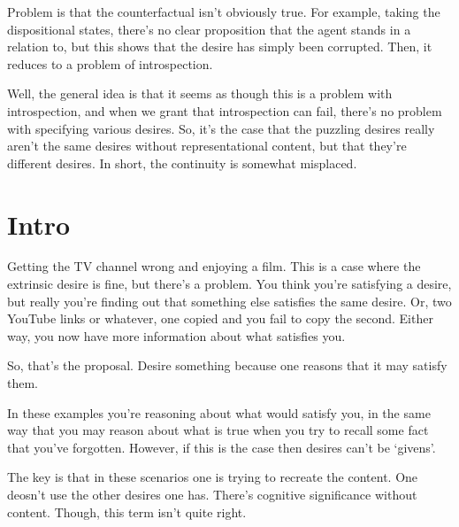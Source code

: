 \documentclass[10pt]{article}
\begin{document}


{\color{red} Problem is that the counterfactual isn't obviously true.
  For example, taking the dispositional states, there's no clear proposition that the agent stands in a relation to, but this shows that the desire has simply been corrupted.
  Then, it reduces to a problem of introspection.}

{\color{blue} Well, the general idea is that it seems as though this is a problem with introspection, and when we grant that introspection can fail, there's no problem with specifying various desires.
  So, it's the case that the puzzling desires really aren't the same desires without representational content, but that they're different desires.
  In short, the continuity is somewhat misplaced.}



\section{Intro}
\label{sec:intro}

Getting the TV channel wrong and enjoying a film.
This is a case where the extrinsic desire is fine, but there's a problem.
You think you're satisfying a desire, but really you're finding out that something else satisfies the same desire.
Or, two YouTube links or whatever, one copied and you fail to copy the second.
Either way, you now have more information about what satisfies you.

So, that's the proposal.
Desire something because one reasons that it may satisfy them.

In these examples you're reasoning about what would satisfy you, in the same way that you may reason about what is true when you try to recall some fact that you've forgotten.
However, if this is the case then desires can't be `givens'.

The key is that in these scenarios one is trying to recreate the content.
One deosn't use the other desires one has.
There's cognitive significance without content.
Though, this term isn't quite right.
\end{document}
